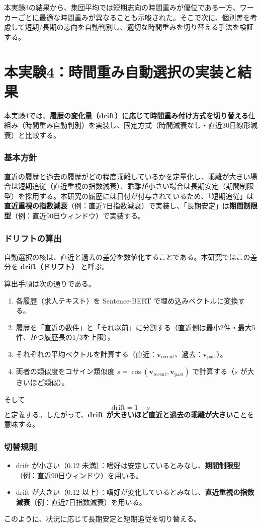 本実験3の結果から、集団平均では短期志向の時間重みが優位である一方、ワーカーごとに最適な時間重みが異なることも示唆された。そこで次に、個別差を考慮して短期/長期の志向を自動判別し、適切な時間重みを切り替える手法を検証する。

\section{本実験4：時間重み自動選択の実装と結果}
本実験4では、\textbf{履歴の変化量（drift）に応じて時間重み付け方式を切り替える}仕組み（時間重み自動判別）を実装し、固定方式（時間減衰なし・直近30日線形減衰）と比較する。

\subsubsection*{基本方針}
直近の履歴と過去の履歴がどの程度乖離しているかを定量化し、乖離が大きい場合は短期追従（直近重視の指数減衰）、乖離が小さい場合は長期安定（期間制限型）を採用する。本研究の履歴には日付が付与されているため、「短期追従」は\textbf{直近重視の指数減衰}（例：直近7日指数減衰）で実装し、「長期安定」は\textbf{期間制限型}（例：直近90日ウィンドウ）で実装する。

\subsubsection*{ドリフトの算出}
自動選択の核は、直近と過去の差分を数値化することである。本研究ではこの差分を \textbf{drift（ドリフト）} と呼ぶ。

算出手順は次の通りである。
\begin{enumerate}
	\item 各履歴（求人テキスト）を Sentence-BERT で埋め込みベクトルに変換する。
	\item 履歴を「直近の数件」と「それ以前」に分割する（直近側は最小2件・最大5件、かつ履歴長の1/3を上限）。
	\item それぞれの平均ベクトルを計算する（直近：$\bm{v}_{\mathrm{recent}}$、過去：$\bm{v}_{\mathrm{past}}$）。
	\item 両者の類似度をコサイン類似度 $s=\cos(\bm{v}_{\mathrm{recent}},\bm{v}_{\mathrm{past}})$ で計算する（$s$ が大きいほど類似）。
\end{enumerate}
そして
\[
\mathrm{drift} = 1 - s
\]
と定義する。したがって、\textbf{drift が大きいほど直近と過去の乖離が大きい}ことを意味する。

\subsubsection*{切替規則}
\begin{itemize}
	\item drift が小さい（0.12 未満）：嗜好は安定しているとみなし、\textbf{期間制限型}（例：直近90日ウィンドウ）を用いる。
	\item drift が大きい（0.12 以上）：嗜好が変化しているとみなし、\textbf{直近重視の指数減衰}（例：直近7日指数減衰）を用いる。
\end{itemize}
このように、状況に応じて長期安定と短期追従を切り替える。

